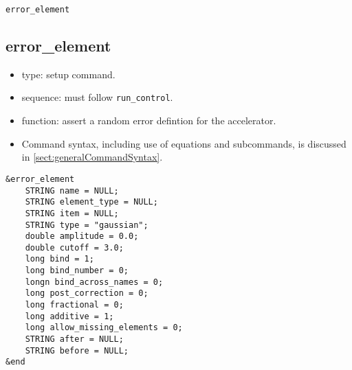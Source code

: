 \documentclass[11pt]{article}
\begin{document}
\newpage
\begin{center}{\Large\verb|error_element|}\end{center}
\subsection{error\_element \label{subsec:errorelement}}

\begin{itemize}
\item type: setup command.
\item sequence: must follow \verb|run_control|.
\item function: assert a random error defintion for the accelerator.
\item Command syntax, including use of equations and subcommands, is discussed in \ref{sect:generalCommandSyntax}.
\end{itemize}

\begin{verbatim}
&error_element
    STRING name = NULL;
    STRING element_type = NULL;
    STRING item = NULL;
    STRING type = "gaussian";
    double amplitude = 0.0;
    double cutoff = 3.0;
    long bind = 1;
    long bind_number = 0;
    longn bind_across_names = 0;
    long post_correction = 0;
    long fractional = 0;
    long additive = 1;
    long allow_missing_elements = 0;
    STRING after = NULL;
    STRING before = NULL;
&end
\end{verbatim}
\end{document}
